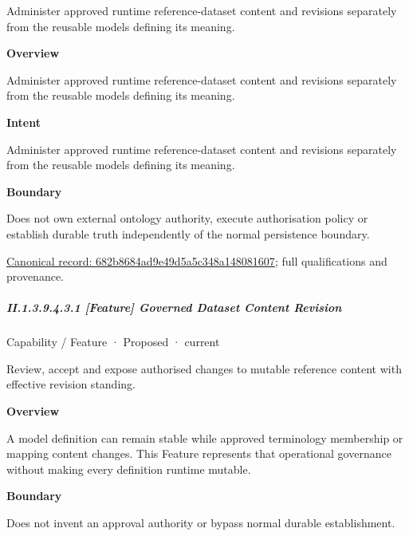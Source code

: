 Administer approved runtime reference-dataset content and revisions separately from the reusable models defining its meaning.



\textbf{Overview}



Administer approved runtime reference-dataset content and revisions separately from the reusable models defining its meaning.



\textbf{Intent}



Administer approved runtime reference-dataset content and revisions separately from the reusable models defining its meaning.



\textbf{Boundary}



Does not own external ontology authority, execute authorisation policy or establish durable truth independently of the normal persistence boundary.


{\footnotesize \href{../../../../continuum/strategy/capability/682b8684ad9e49d5a5c348a148081607.md}{Canonical record: 682b8684ad9e49d5a5c348a148081607}; full qualifications and provenance.}\par
\subparagraph*{II.1.3.9.4.3.1 [Feature] Governed Dataset Content Revision}
\label{navigation:II.1.3.9.4.3.1}

\label{element:89123c868b8a46c38800916110cd918d}
{\small Capability / Feature · Proposed · current}\par

Review, accept and expose authorised changes to mutable reference content with effective revision standing.



\textbf{Overview}



A model definition can remain stable while approved terminology membership or mapping content changes. This Feature represents that operational governance without making every definition runtime mutable.



\textbf{Boundary}



Does not invent an approval authority or bypass normal durable establishment.


